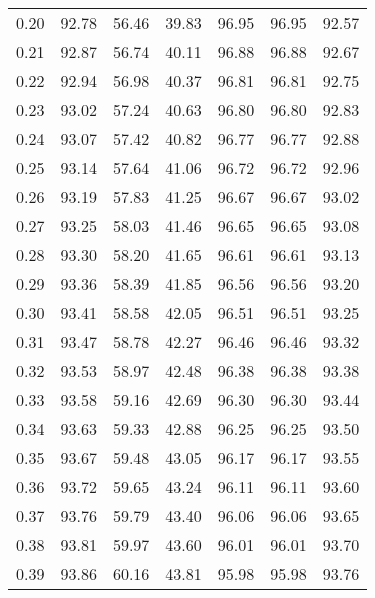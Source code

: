 \begin{tabular}{|c|c|c|c|c|c|c|}
      0.20 &     92.78 &     56.46 &      39.83 &   96.95 &      96.95 &         92.57 \\
      0.21 &     92.87 &     56.74 &      40.11 &   96.88 &      96.88 &         92.67 \\
      0.22 &     92.94 &     56.98 &      40.37 &   96.81 &      96.81 &         92.75 \\
      0.23 &     93.02 &     57.24 &      40.63 &   96.80 &      96.80 &         92.83 \\
      0.24 &     93.07 &     57.42 &      40.82 &   96.77 &      96.77 &         92.88 \\
      0.25 &     93.14 &     57.64 &      41.06 &   96.72 &      96.72 &         92.96 \\
      0.26 &     93.19 &     57.83 &      41.25 &   96.67 &      96.67 &         93.02 \\
      0.27 &     93.25 &     58.03 &      41.46 &   96.65 &      96.65 &         93.08 \\
      0.28 &     93.30 &     58.20 &      41.65 &   96.61 &      96.61 &         93.13 \\
      0.29 &     93.36 &     58.39 &      41.85 &   96.56 &      96.56 &         93.20 \\
      0.30 &     93.41 &     58.58 &      42.05 &   96.51 &      96.51 &         93.25 \\
      0.31 &     93.47 &     58.78 &      42.27 &   96.46 &      96.46 &         93.32 \\
      0.32 &     93.53 &     58.97 &      42.48 &   96.38 &      96.38 &         93.38 \\
      0.33 &     93.58 &     59.16 &      42.69 &   96.30 &      96.30 &         93.44 \\
      0.34 &     93.63 &     59.33 &      42.88 &   96.25 &      96.25 &         93.50 \\
      0.35 &     93.67 &     59.48 &      43.05 &   96.17 &      96.17 &         93.55 \\
      0.36 &     93.72 &     59.65 &      43.24 &   96.11 &      96.11 &         93.60 \\
      0.37 &     93.76 &     59.79 &      43.40 &   96.06 &      96.06 &         93.65 \\
      0.38 &     93.81 &     59.97 &      43.60 &   96.01 &      96.01 &         93.70 \\
      0.39 &     93.86 &     60.16 &      43.81 &   95.98 &      95.98 &         93.76 \\

\end{tabular}
